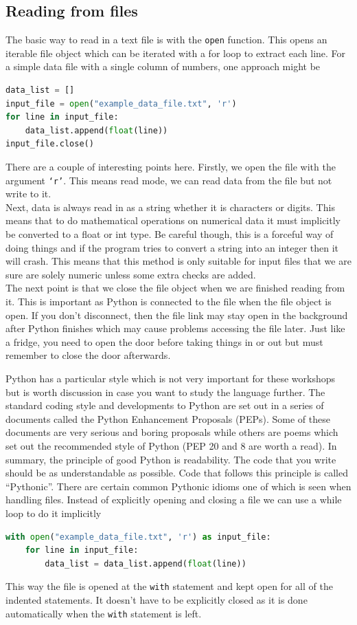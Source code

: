 	\subsection{Reading from files}
		The basic way to read in a text file is with the \texttt{open} function. This opens an iterable file object which can be iterated with a for loop to extract each line. For a simple data file with a single column of numbers, one approach might be
		\begin{lstlisting}[language=Python]
data_list = []
input_file = open("example_data_file.txt", 'r')
for line in input_file:
	data_list.append(float(line))
input_file.close()
\end{lstlisting}	
		There are a couple of interesting points here. Firstly, we open the file with the argument \texttt{`r'}. This means read mode, we can read data from the file but not write to it.\\
		Next, data is always read in as a string whether it is characters or digits. This means that to do mathematical operations on numerical data it must implicitly be converted to a float or int type. Be careful though, this is a forceful way of doing things and if the program tries to convert a string into an integer then it will crash. This means that this method is only suitable for input files that we are sure are solely numeric unless some extra checks are added.\\
		The next point is that we close the file object when we are finished reading from it. This is important as Python is connected to the file when the file object is open. If you don't disconnect, then the file link may stay open in the background after Python finishes which may cause problems accessing the file later. Just like a fridge, you need to open the door before taking things in or out but must remember to close the door afterwards.

		Python has a particular style which is not very important for these workshops but is worth discussion in case you want to study the language further. The standard coding style and developments to Python are set out in a series of documents called the Python Enhancement Proposals (PEPs). Some of these documents are very serious and boring proposals while others are poems which set out the recommended style of Python (PEP 20 and 8 are worth a read). In summary, the principle of good Python is readability. The code that you write should be as understandable as possible. Code that follows this principle is called ``Pythonic''. There are certain common Pythonic idioms one of which is seen when handling files. Instead of explicitly opening and closing a file we can use a while loop to do it implicitly
		\begin{lstlisting}[language=Python]
with open("example_data_file.txt", 'r') as input_file:
	for line in input_file:
		data_list = data_list.append(float(line))
\end{lstlisting}	
This way the file is opened at the \texttt{with} statement and kept open for all of the indented statements. It doesn't have to be explicitly closed as it is done automatically when the \texttt{with} statement is left.

